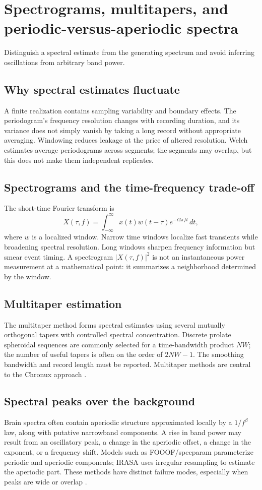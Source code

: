 \chapter{Spectrograms, multitapers, and periodic-versus-aperiodic spectra}\label{ch:spectral}
\begin{readergoal}Distinguish a spectral estimate from the generating spectrum and avoid inferring oscillations from arbitrary band power.\end{readergoal}
\section{Why spectral estimates fluctuate}
A finite realization contains sampling variability and boundary effects. The periodogram's frequency resolution changes with recording duration, and its variance does not simply vanish by taking a long record without appropriate averaging. Windowing reduces leakage at the price of altered resolution. Welch estimates average periodograms across segments; the segments may overlap, but this does not make them independent replicates.

\section{Spectrograms and the time-frequency trade-off}
The short-time Fourier transform is
\[X(\tau,f)=\int_{-\infty}^{\infty}x(t)w(t-\tau)e^{-i2\pi ft}\,dt,\]
where $w$ is a localized window. Narrow time windows localize fast transients while broadening spectral resolution. Long windows sharpen frequency information but smear event timing. A spectrogram $|X(\tau,f)|^2$ is not an instantaneous power measurement at a mathematical point: it summarizes a neighborhood determined by the window.

\section{Multitaper estimation}
The multitaper method forms spectral estimates using several mutually orthogonal tapers with controlled spectral concentration. Discrete prolate spheroidal sequences are commonly selected for a time-bandwidth product $NW$; the number of useful tapers is often on the order of $2NW-1$. The smoothing bandwidth and record length must be reported. Multitaper methods are central to the Chronux approach \cite{Bokil2010}.

\section{Spectral peaks over the background}
Brain spectra often contain aperiodic structure approximated locally by a $1/f^\beta$ law, along with putative narrowband components. A rise in band power may result from an oscillatory peak, a change in the aperiodic offset, a change in the exponent, or a frequency shift. Models such as FOOOF/specparam parameterize periodic and aperiodic components; IRASA uses irregular resampling to estimate the aperiodic part. These methods have distinct failure modes, especially when peaks are wide or overlap \cite{Donoghue2020,Gerster2022}.

